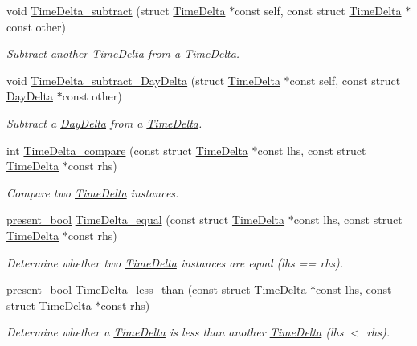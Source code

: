\begin{DoxyCompactItemize}
void \hyperlink{time-delta_8h_aabc9864d36d4b617bccd6af5baba8fa2}{Time\-Delta\-\_\-subtract} (struct \hyperlink{structTimeDelta}{Time\-Delta} $\ast$const self, const struct \hyperlink{structTimeDelta}{Time\-Delta} $\ast$const other)
\begin{DoxyCompactList}\small\item\em Subtract another \hyperlink{structTimeDelta}{Time\-Delta} from a \hyperlink{structTimeDelta}{Time\-Delta}. \end{DoxyCompactList}\item 
void \hyperlink{time-delta_8h_a4c1cce3fe60da8412454e06e9b4a8a1d}{Time\-Delta\-\_\-subtract\-\_\-\-Day\-Delta} (struct \hyperlink{structTimeDelta}{Time\-Delta} $\ast$const self, const struct \hyperlink{structDayDelta}{Day\-Delta} $\ast$const other)
\begin{DoxyCompactList}\small\item\em Subtract a \hyperlink{structDayDelta}{Day\-Delta} from a \hyperlink{structTimeDelta}{Time\-Delta}. \end{DoxyCompactList}\item 
int \hyperlink{time-delta_8h_a1864d69bcd1b4cf445555bc72c21a653}{Time\-Delta\-\_\-compare} (const struct \hyperlink{structTimeDelta}{Time\-Delta} $\ast$const lhs, const struct \hyperlink{structTimeDelta}{Time\-Delta} $\ast$const rhs)
\begin{DoxyCompactList}\small\item\em Compare two \hyperlink{structTimeDelta}{Time\-Delta} instances. \end{DoxyCompactList}\item 
\hyperlink{types_8h_a1c24e2cdd988b886e889080ded176ae0}{present\-\_\-bool} \hyperlink{time-delta_8h_a99614ad03a84af18cd60d8b25d5c4cee}{Time\-Delta\-\_\-equal} (const struct \hyperlink{structTimeDelta}{Time\-Delta} $\ast$const lhs, const struct \hyperlink{structTimeDelta}{Time\-Delta} $\ast$const rhs)
\begin{DoxyCompactList}\small\item\em Determine whether two \hyperlink{structTimeDelta}{Time\-Delta} instances are equal (lhs == rhs). \end{DoxyCompactList}\item 
\hyperlink{types_8h_a1c24e2cdd988b886e889080ded176ae0}{present\-\_\-bool} \hyperlink{time-delta_8h_a17c72c9312884c0aabbfbcc6c195fa5e}{Time\-Delta\-\_\-less\-\_\-than} (const struct \hyperlink{structTimeDelta}{Time\-Delta} $\ast$const lhs, const struct \hyperlink{structTimeDelta}{Time\-Delta} $\ast$const rhs)
\begin{DoxyCompactList}\small\item\em Determine whether a \hyperlink{structTimeDelta}{Time\-Delta} is less than another \hyperlink{structTimeDelta}{Time\-Delta} (lhs $<$ rhs). \end{DoxyCompactList}\item 

\end{DoxyCompactItemize}
